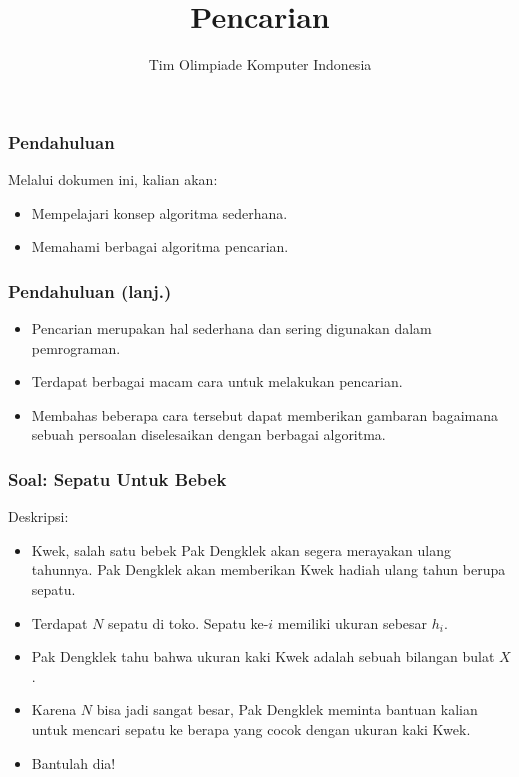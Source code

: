 

\title{Pencarian}
\author{Tim Olimpiade Komputer Indonesia}
\date{}



\begin{frame}
\titlepage
\end{frame}

\begin{frame}
\frametitle{Pendahuluan}
Melalui dokumen ini, kalian akan:
\begin{itemize}
  \item Mempelajari konsep algoritma sederhana.
  \item Memahami berbagai algoritma pencarian.
\end{itemize}
\end{frame}

\begin{frame}
\frametitle{Pendahuluan (lanj.)}
\begin{itemize}
  \item Pencarian merupakan hal sederhana dan sering digunakan dalam pemrograman.
  \item Terdapat berbagai macam cara untuk melakukan pencarian. 
  \item Membahas beberapa cara tersebut dapat memberikan gambaran bagaimana sebuah persoalan diselesaikan dengan berbagai algoritma.
\end{itemize}
\end{frame}

\begin{frame}
\frametitle{Soal: Sepatu Untuk Bebek}
Deskripsi:
\begin{itemize}
  \item Kwek, salah satu bebek Pak Dengklek akan segera merayakan ulang tahunnya. Pak Dengklek akan memberikan Kwek hadiah ulang tahun berupa sepatu.
  \item Terdapat $N$ sepatu di toko. Sepatu ke-$i$ memiliki ukuran sebesar $h_i$.
  \item Pak Dengklek tahu bahwa ukuran kaki Kwek adalah sebuah bilangan bulat $X$.
  \item Karena $N$ bisa jadi sangat besar, Pak Dengklek meminta bantuan kalian untuk mencari sepatu ke berapa yang cocok dengan ukuran kaki Kwek.
  \item Bantulah dia!
\end{itemize}
\end{frame}

